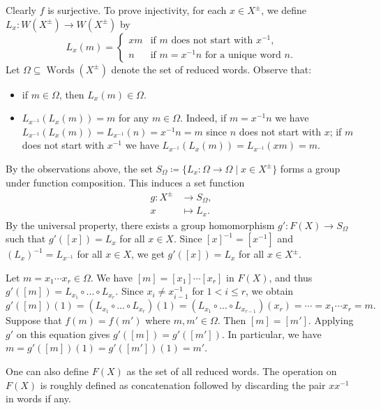 \begin{sketch}
	Clearly $f$ is surjective. To prove injectivity, for each $x \in X^{\pm}$, we define $L_x:W(X^\pm) \to W(X^\pm)$ by
	\begin{equation*}
		L_x(m) = \begin{cases}
			xm &\text{if $m$ does not start with $x^{-1}$},
			\\
			n & \text{if $m = x^{-1}n$ for a unique word $n$}.
		\end{cases}
	\end{equation*}  
	Let  $\Omega \subseteq \operatorname{Words}(X^{\pm})$ denote the  set of reduced words. Observe that:
	\begin{itemize}
		\item if $m\in \Omega$, then $L_x(m)\in \Omega$.
		\item $L_{x^{-1}}(L_x(m)) = m$ for any $m\in\Omega$. Indeed, if $m = x^{-1}n$ we have $L_{x^{-1}}(L_x(m)) = L_{x^{-1}}(n) = x^{-1}n = m$ since $n$ does not start with $x$; if $m$ does not start with $x^{-1}$ we have $L_{x^{-1}}(L_x(m)) = L_{x^{-1}}(xm) = m$.
	\end{itemize}    
	By the observations above, the set $S_\Omega\coloneq\{L_x:\Omega \to \Omega\mid x\in X^\pm\}$ forms a group under function composition. This induces a set function
	\begin{align*}
		g:X^{\pm} &\to S_\Omega,
		\\
		x & \mapsto L_x.
	\end{align*}
	By the universal property, there exists a group homomorphism $g': F(X) \to S_{\Omega}$ such that $g'([x])=L_x$ for all $x \in X$. Since $[x]^{-1} = [x^{-1}]$ and $(L_x)^{-1} = L_{x^{-1}}$ for all $x\in X$, we get $g'([x])=L_x$ for all $x \in X^\pm$.
	
	Let $m = x_1 \cdots x_r \in \Omega$. We have $[m] = [x_1] \cdots [x_r]$ in $F(X)$, and thus $g'([m]) = L_{x_1} \circ \dots \circ L_{x_r}$. Since  $x_i \neq x_{i-1}^{-1}$ for $1 < i \le r$, we obtain
	\begin{equation*}
		g'([m])(1) = (L_{x_1} \circ \dots \circ L_{x_r})(1) = (L_{x_1} \circ \dots \circ L_{x_{r-1}})(x_r) = \cdots = x_1 \cdots x_r = m.
	\end{equation*}
	Suppose that $f(m) = f(m')$ where $m,m'\in\Omega$. Then $[m] = [m']$. Applying $g'$ on this equation gives $g'([m]) = g'([m'])$. In particular, we have $m = g'([m])(1) = g'([m'])(1) = m'$.  
\end{sketch}
\begin{remark}
	One can also define $F(X)$ as the set of all reduced words. The operation on $F(X)$ is roughly defined as concatenation followed by discarding the pair $xx^{-1}$ in words if any.
\end{remark}
